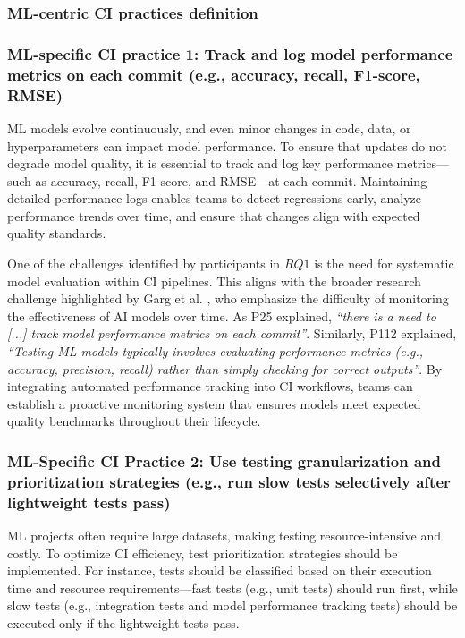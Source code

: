 \subsubsection*{ML-centric CI practices definition}

\subsubsection*{\textbf{ML-specific CI practice 1:} Track and log model performance metrics on each commit (e.g., accuracy, recall, F1-score, RMSE)}

ML models evolve continuously, and even minor changes in code, data, or hyperparameters can impact model performance. To ensure that updates do not degrade model quality, it is essential to track and log key performance metrics—such as accuracy, recall, F1-score, and RMSE—at each commit. 
Maintaining detailed performance logs enables teams to detect regressions early, analyze performance trends over time, and ensure that changes align with expected quality standards.

One of the challenges identified by participants in $RQ1$ is the need for systematic model evaluation within CI pipelines. 
This aligns with the broader research challenge highlighted by Garg et al. \citep{garg2021continuous}, who emphasize the difficulty of monitoring the effectiveness of AI models over time.
As P25 explained, \textit{``there is a need to [...] track model performance metrics on each commit''}. 
Similarly, P112 explained, \textit{``Testing ML models typically involves evaluating performance metrics (e.g., accuracy, precision, recall) rather than simply checking for correct outputs''}. By integrating automated performance tracking into CI workflows, teams can establish a proactive monitoring system that ensures models meet expected quality benchmarks throughout their lifecycle.

\subsubsection*{\textbf{ML-Specific CI Practice 2:} Use testing granularization and prioritization strategies (e.g., run slow tests selectively after lightweight tests pass)}

ML projects often require large datasets, making testing resource-intensive and costly. To optimize CI  efficiency, test prioritization strategies should be implemented. For instance, tests should be classified based on their execution time and resource requirements---fast tests (e.g., unit tests) should run first, while slow tests (e.g., integration tests and model performance tracking tests) should be executed only if the lightweight tests pass.

